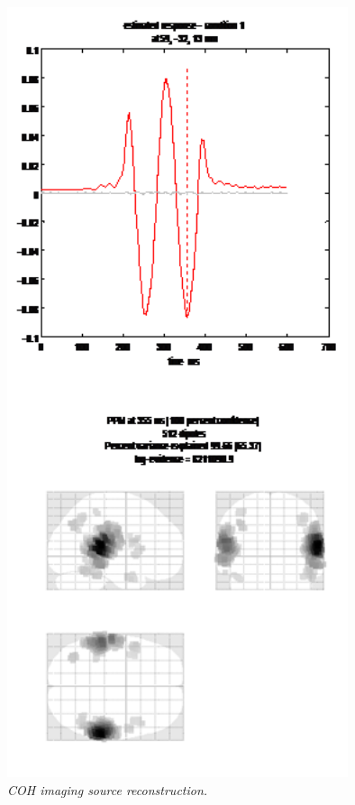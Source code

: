 \begin{figure}
\begin{center}
\includegraphics[width=100mm]{meg_sloc/Slide5}
\caption{\em COH imaging source reconstruction.\label{meg_sloc:fig:5}}
\end{center}
\end{figure}

